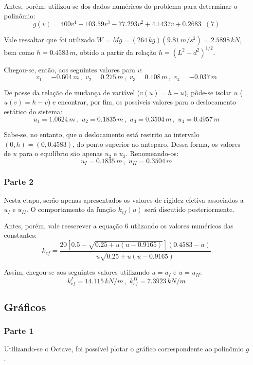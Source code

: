 \documentclass[a4paper, 12pt]{article}
\begin{document}
	Antes, porém, utilizou-se dos dados numéricos do problema para determinar o polinômio:
	$$g(v)=400v^4+103.59v^3-77.293v^2+4.1437v+0.2683\,\,\,(7)$$
	
	Vale ressaltar que foi utilizado $W=Mg=(264\,kg)(9.81\,m/s^2)=2.5898\,kN$, bem como $h=0.4583\,m$, obtido a partir
	da relação $h=(L^2-d^2)^{1/2}$.
	
	Chegou-se, então, aos seguintes valores para $v$: $$v_1=-0.604\,m\,,\,\,v_2=0.275\,m\,,\,\,v_3=0.108\,m
	\,,\,\,v_4=-0.037\,m$$
	
	De posse da relação de mudança de variável ($v(u)=h-u$), pôde-se isolar $u$ ($u(v)=h-v$) e encontrar, por fim, os 
	possíveis valores para o deslocamento estático do sistema:
	$$u_1=1.0624\,m\,,\,\,u_2=0.1835\,m\,,\,\,u_3=0.3504\,m\,,\,\,u_4=0.4957\,m$$
	
	Sabe-se, no entanto, que o deslocamento está restrito ao intervalo $(0,h)=(0,0.4583)$, do ponto superior ao anteparo.
	Dessa forma, os valores de $u$ para o equilíbrio são apenas $u_2$ e $u_3$. Renomeando-os:
	$$u_I=0.1835\,m\,,\,\,u_{II}=0.3504\,m$$
	
	\subsubsection{Parte 2}
	
	Nesta etapa, serão apenas apresentados os valores de rigidez efetiva associados a $u_I$ e $u_{II}$. O comportamento
	da função $k_{ef}(u)$ será discutido posteriormente.
	
	Antes, porém, vale reescrever a equação 6 utlizando os valores numéricos das constantes:
	$$k_{ef}=\frac{20[0.5-\sqrt{0.25+u(u-0.9165)}](0.4583-u)}{u\sqrt{0.25+u(u-0.9165)}}$$
	
	Assim, chegou-se aos seguintes valores utilizando $u=u_I$ e $u=u_{II}$: 
	$$k_{ef}^{I}=14.115\,kN/m\,,\,\,k_{ef}^{II}=7.3923\,kN/m$$ 
			
	
	\newpage
	
	\subsection{Gráficos}
	
	\subsubsection{Parte 1}
	
	Utilizando-se o Octave, foi possível plotar o gráfico correspondente ao polinômio $g$. 
	
\end{document}
